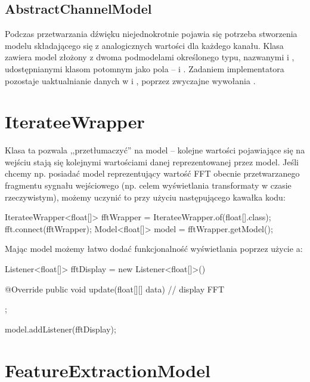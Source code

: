 \subsection{AbstractChannelModel}

Podczas przetwarzania dźwięku niejednokrotnie pojawia się potrzeba stworzenia modelu składającego
się z analogicznych wartości dla każdego kanału. Klasa  zawiera model
złożony z dwoma podmodelami określonego typu, nazwanymi  i , udostępnianymi
klasom potomnym jako pola  --  i . Zadaniem
implementatora pozostaje uaktualnianie danych w  i , poprzez
zwyczajne wywołania .

\section{IterateeWrapper}

Klasa ta pozwala ,,przetłumaczyć''  na model -- kolejne wartości pojawiające się na
wejściu  stają się kolejnymi wartościami danej reprezentowanej przez model. Jeśli
chcemy np. posiadać model reprezentujący wartość FFT obecnie przetwarzanego fragmentu sygnału
wejściowego (np. celem wyświetlania transformaty w czasie rzeczywistym), możemy uczynić to przy
użyciu następującego kawałka kodu:

\begin{java}
IterateeWrapper<float[]> fftWrapper = IterateeWrapper.of(float[].class);
fft.connect(fftWrapper);
Model<float[]> model = fftWrapper.getModel();
\end{java}

Mając model możemy łatwo dodać funkcjonalność wyświetlania poprzez użycie a:

\begin{java}
Listener<float[]> fftDisplay = new Listener<float[]>() {

    @Override
    public void update(float[][] data) {
        // display FFT
    }
};

model.addListener(fftDisplay);
\end{java}

\section{FeatureExtractionModel}

